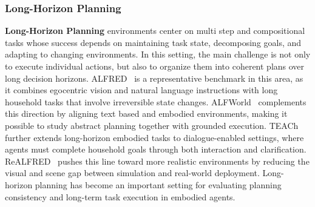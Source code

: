 \documentclass{llmxive}
\begin{document}
\subsubsection{Long-Horizon Planning}
\label{Long-Horizon Planning}
\textbf{Long-Horizon Planning} environments center on multi step and compositional tasks whose success depends on maintaining task state, decomposing goals, and adapting to changing environments. In this setting, the main challenge is not only to execute individual actions, but also to organize them into coherent plans over long decision horizons.
ALFRED~\cite{ALFRED} is a representative benchmark in this area, as it combines egocentric vision and natural language instructions with long household tasks that involve irreversible state changes. ALFWorld~\cite{ALFWorld} complements this direction by aligning text based and embodied environments, making it possible to study abstract planning together with grounded execution. TEACh~\cite{TEAch} further extends long-horizon embodied tasks to dialogue-enabled settings, where agents must complete household goals through both interaction and clarification. ReALFRED~\cite{ReALFRED} pushes this line toward more realistic environments by reducing the visual and scene gap between simulation and real-world deployment. Long-horizon planning has become an important setting for evaluating planning consistency and long-term task execution in embodied agents.
\end{document}
